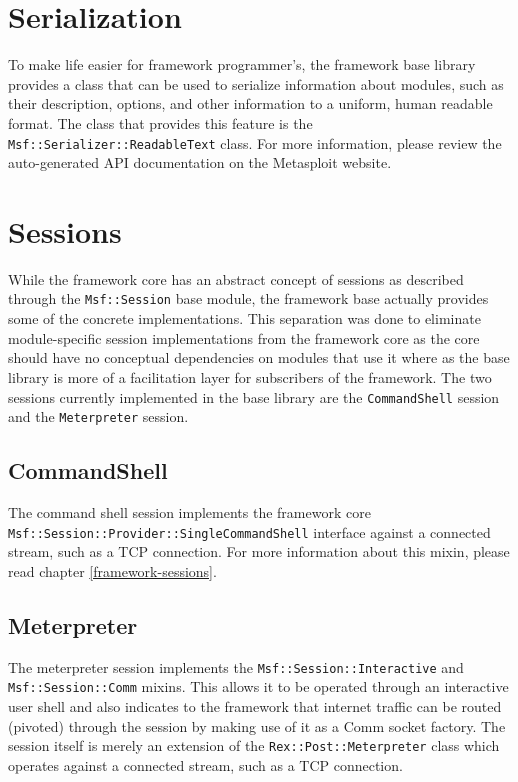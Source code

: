 \documentclass{report}
\begin{document}
    \section{Serialization}

\par
To make life easier for framework programmer's, the framework base
library provides a class that can be used to serialize information
about modules, such as their description, options, and other
information to a uniform, human readable format.  The class that
provides this feature is the \texttt{Msf::Serializer::ReadableText}
class.  For more information, please review the auto-generated API
documentation on the Metasploit website.

    \section{Sessions}

\par
While the framework core has an abstract concept of sessions as
described through the \texttt{Msf::Session} base module, the
framework base actually provides some of the concrete
implementations.  This separation was done to eliminate
module-specific session implementations from the framework core as
the core should have no conceptual dependencies on modules that use
it where as the base library is more of a facilitation layer for
subscribers of the framework.  The two sessions currently
implemented in the base library are the \texttt{CommandShell}
session and the \texttt{Meterpreter} session.

        \subsection{CommandShell}

\par
The command shell session implements the framework core \\
\texttt{Msf::Session::Provider::SingleCommandShell} interface
against a connected stream, such as a TCP connection.  For more
information about this mixin, please read chapter
\ref{framework-sessions}.

        \subsection{Meterpreter}

\par
The meterpreter session implements the
\texttt{Msf::Session::Interactive} and \\
\texttt{Msf::Session::Comm}
mixins.  This allows it to be operated through an interactive user
shell and also indicates to the framework that internet traffic can
be routed (pivoted) through the session by making use of it as a
Comm socket factory.  The session itself is merely an extension of
the \texttt{Rex::Post::Meterpreter} class which operates against a
connected stream, such as a TCP connection.
\end{document}
